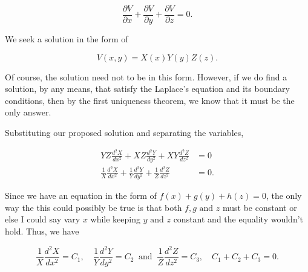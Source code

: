 \documentclass[english,a4paper,12pt]{report}
\begin{document}
\begin{equation}
    \frac{\partial V}{\partial x}  + \frac{\partial V}{\partial y}  + \frac{\partial V}{\partial z}  = 0. 
\end{equation}
            
We seek a solution in the form of 
    
\begin{equation}
    V(x,y) = X(x)Y(y)Z(z).
\end{equation}
    
Of course, the solution need not to be in this form. However, if we do find a solution, by any means, that satisfy the Laplace's equation and its boundary conditions, then by the first uniqueness theorem, we know that it must be the only answer. 
    
Substituting our proposed solution and separating the variables,
    
\begin{equation}
    \begin{aligned}
        YZ \frac{d^2X}{dx^2} + XZ \frac{d^2Y}{dy^2} + XY \frac{d^2Z}{dz^2} &= 0 \\
        \frac{1}{X} \frac{d^2X}{dx^2} + \frac{1}{Y} \frac{d^2Y}{dy^2} + \frac{1}{Z} \frac{d^2Z}{dz^2} &= 0. 
    \end{aligned}
\end{equation}
    
Since we have an equation in the form of \(f(x) + g(y) + h(z) = 0\), the only way the this could possibly be true is that both  \(f,g \text{ and }  z\) must be constant or else I could say vary \(x\) while keeping \(y \text { and } z\) constant and the equality wouldn't hold. Thus, we have
    
\begin{equation}
    \frac{1}{X} \frac{d^2X}{dx^2} = C_1, \quad \frac{1}{Y} \frac{d^2Y}{dy^2} = C_2 ~ \text{ and } ~ \frac{1}{Z} \frac{d^2Z}{dz^2} = C_3, \quad C_1 + C_2 + C_3 = 0.
\end{equation}
\end{document}
